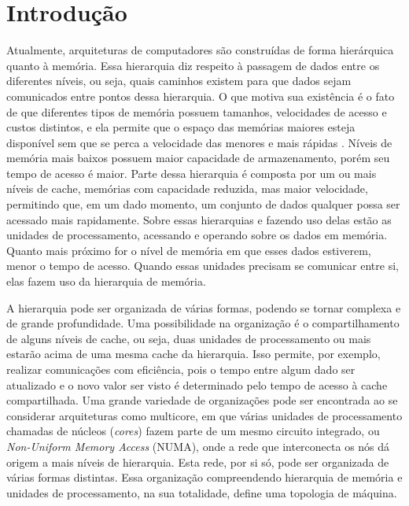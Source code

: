 \chapter{Introdução}
\label{cap:introducao}
\acresetall


Atualmente, arquiteturas de computadores são construídas de forma hierárquica quanto à memória.
Essa hierarquia diz respeito à passagem de dados entre os diferentes níveis, ou seja, quais caminhos existem para que dados sejam comunicados entre pontos dessa hierarquia.
O que motiva sua existência é o fato de que diferentes tipos de memória possuem tamanhos, velocidades de acesso e custos distintos, e ela permite que o espaço das memórias maiores esteja disponível sem que se perca a velocidade das menores e mais rápidas \cite{Patterson}.
Níveis de memória mais baixos possuem maior capacidade de armazenamento, porém seu tempo de acesso é maior.
Parte dessa hierarquia é composta por um ou mais níveis de cache, memórias com capacidade reduzida, mas maior velocidade, permitindo que, em um dado momento, um conjunto de dados qualquer possa ser acessado mais rapidamente.
Sobre essas hierarquias e fazendo uso delas estão as unidades de processamento, acessando e operando sobre os dados em memória.
Quanto mais próximo for o nível de memória em que esses dados estiverem, menor o tempo de acesso.
Quando essas unidades precisam se comunicar entre si, elas fazem uso da hierarquia de memória.

A hierarquia pode ser organizada de várias formas, podendo se tornar complexa e de grande profundidade.
Uma possibilidade na organização é o compartilhamento de alguns níveis de cache, ou seja, duas unidades de processamento ou mais estarão acima de uma mesma cache da hierarquia.
Isso permite, por exemplo, realizar comunicações com eficiência, pois o tempo entre algum dado ser atualizado e o novo valor ser visto é determinado pelo tempo de acesso à cache compartilhada.
Uma grande variedade de organizações pode ser encontrada ao se considerar arquiteturas como multicore, em que várias unidades de processamento chamadas de núcleos (\textit{cores}) fazem parte de um mesmo circuito integrado, ou \textit{Non-Uniform Memory Access} (NUMA), onde a rede que interconecta os nós dá origem a mais níveis de hierarquia. Esta rede, por si só, pode ser organizada de várias formas distintas.
Essa organização compreendendo hierarquia de memória e unidades de processamento, na sua totalidade, define uma topologia de máquina.

